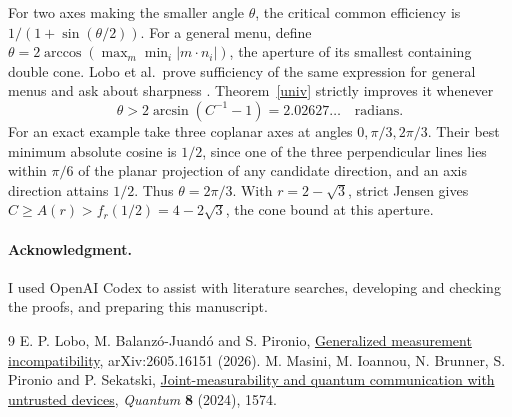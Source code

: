\documentclass[11pt,a4paper]{article}
\theoremstyle{remark}
\newcommand{\ack}{\paragraph*{Acknowledgment.} I used OpenAI Codex to assist with literature searches, developing and checking the proofs, and preparing this manuscript.}
\begin{document}
For two axes making the smaller angle \(\theta\), the critical common efficiency is \(1/(1+\sin(\theta/2))\). For a general menu, define \(\theta=2\arccos(\max_m\min_i |m\cdot n_i|)\), the aperture of its smallest containing double cone. Lobo et al.\ prove sufficiency of the same expression for general menus and ask about sharpness \cite[Eq.~(20) and discussion following Eq.~(35)]{LBP}. Theorem~\ref{univ} strictly improves it whenever
\[
               \theta>2\arcsin(C^{-1}-1)=2.02627\ldots
               \quad\text{radians}.
\]
For an exact example take three coplanar axes at angles \(0,\pi/3,2\pi/3\). Their best minimum absolute cosine is \(1/2\), since one of the three perpendicular lines lies within \(\pi/6\) of the planar projection of any candidate direction, and an axis direction attains \(1/2\). Thus \(\theta=2\pi/3\). With \(r=2-\sqrt3\), strict Jensen gives \(C\ge A(r)>f_r(1/2)=4-2\sqrt3\), the cone bound at this aperture.

\ack
\begin{thebibliography}{9}
 E. P. Lobo, M. Balanz\'o-Juand\'o and S. Pironio, \href{https://arxiv.org/abs/2605.16151}{Generalized measurement incompatibility}, arXiv:2605.16151 (2026).
 M. Masini, M. Ioannou, N. Brunner, S. Pironio and P. Sekatski, \href{https://doi.org/10.22331/q-2024-12-23-1574}{Joint-measurability and quantum communication with untrusted devices}, \emph{Quantum} \textbf{8} (2024), 1574.
\end{thebibliography}
\end{document}
